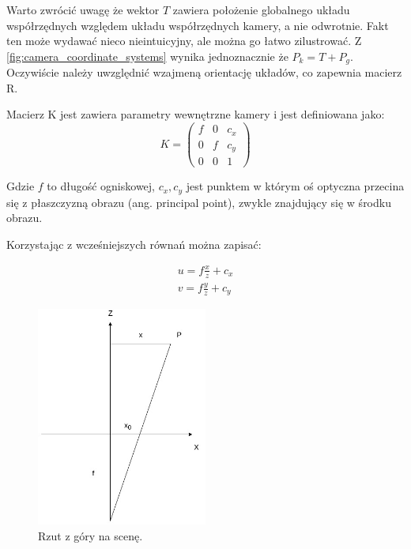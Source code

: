 \documentclass[oneside, eng]{mgr}
\begin{document}
Warto zwrócić uwagę że wektor $T$ zawiera położenie globalnego układu współrzędnych względem układu współrzędnych kamery, a nie odwrotnie. Fakt ten może wydawać nieco nieintuicyjny, ale można go łatwo zilustrować. Z \ref{fig:camera_coordinate_systems} wynika jednoznacznie że $P_k = T + P_g$. Oczywiście należy uwzględnić wzajmeną orientację układów, co zapewnia macierz R.

Macierz K jest zawiera parametry wewnętrzne kamery i jest definiowana jako:
\begin{equation}
	K = \left( \begin{array}{lll}
		f & 0 & c_x \\
		0 & f & c_y \\
		0 & 0 & 1
	\end{array} \right)
\end{equation}

Gdzie $f$ to długość ogniskowej, $c_x, c_y$ jest punktem w którym oś optyczna przecina się z płaszczyzną obrazu (ang. principal point), zwykle znajdujący się w środku obrazu.

Korzystając z wcześniejszych równań można zapisać:

\begin{align*}
	u = f \frac{x}{z} + c_x \\
	v = f \frac{y}{z} + c_y
\end{align*}

\begin{figure}
\centering
	\includegraphics[width=0.50\textwidth]{rzutowanie.jpg}\par\vspace{1cm}
\caption{Rzut z góry na scenę.}
	\label{fig:projection_up}
\end{figure}
\end{document}
